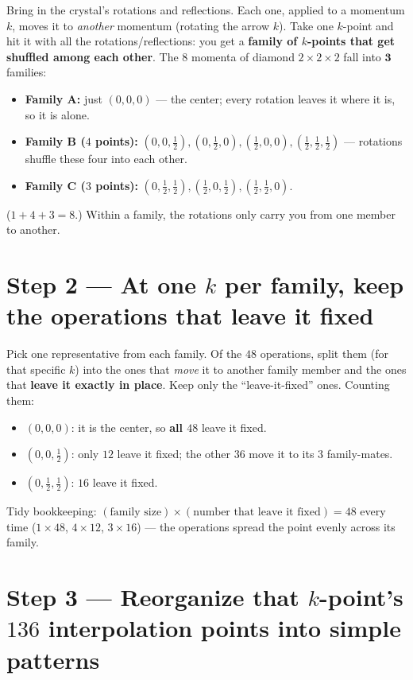 \documentclass[11pt]{article}
\begin{document}
Bring in the crystal's rotations and reflections. Each one, applied to a momentum $k$, moves it to
\emph{another} momentum (rotating the arrow $k$). Take one $k$-point and hit it with all the
rotations/reflections: you get a \textbf{family of $k$-points that get shuffled among each other}.
The $8$ momenta of diamond $2\times2\times2$ fall into $\mathbf{3}$ families:
\begin{itemize}[nosep]
  \item \textbf{Family A:} just $(0,0,0)$ --- the center; every rotation leaves it where it is, so it
        is alone.
  \item \textbf{Family B ($4$ points):} $(0,0,\tfrac12),(0,\tfrac12,0),(\tfrac12,0,0),(\tfrac12,\tfrac12,\tfrac12)$ ---
        rotations shuffle these four into each other.
  \item \textbf{Family C ($3$ points):} $(0,\tfrac12,\tfrac12),(\tfrac12,0,\tfrac12),(\tfrac12,\tfrac12,0)$.
\end{itemize}
($1+4+3=8$.) Within a family, the rotations only carry you from one member to another.

\section*{Step 2 --- At one $k$ per family, keep the operations that leave it fixed}

Pick one representative from each family. Of the $48$ operations, split them (for that specific $k$)
into the ones that \emph{move} it to another family member and the ones that \textbf{leave it exactly
in place}. Keep only the ``leave-it-fixed'' ones. Counting them:
\begin{itemize}[nosep]
  \item $(0,0,0)$: it is the center, so \textbf{all $48$} leave it fixed.
  \item $(0,0,\tfrac12)$: only \textbf{$12$} leave it fixed; the other $36$ move it to its $3$ family-mates.
  \item $(0,\tfrac12,\tfrac12)$: \textbf{$16$} leave it fixed.
\end{itemize}
Tidy bookkeeping: $(\text{family size})\times(\text{number that leave it fixed})=48$ every time
($1\times48$, $4\times12$, $3\times16$) --- the operations spread the point evenly across its family.

\section*{Step 3 --- Reorganize that $k$-point's $136$ interpolation points into simple patterns}
\end{document}
